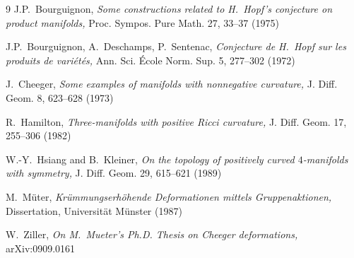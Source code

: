 \documentclass[11pt]{amsart}
\theoremstyle{definition}
\begin{document}
\begin{thebibliography}{9}
J.P.~Bourguignon, \textit{Some constructions related to H.~Hopf's conjecture on product manifolds,} Proc. Sympos. Pure Math. 27, 33--37 (1975)

J.P.~Bourguignon, A.~Deschamps, P.~Sentenac, \textit{Conjecture de H.~Hopf sur les produits de vari\'et\'es,} Ann. Sci. \'Ecole Norm. Sup. 5, 277--302 (1972)

J.~Cheeger, \textit{Some examples of manifolds with nonnegative curvature,} J. Diff. Geom. 8, 623--628 (1973)

R.~Hamilton, \textit{Three-manifolds with positive Ricci curvature,} J. Diff. Geom. 17, 255--306 (1982)

W.-Y.~Hsiang and B.~Kleiner, \textit{On the topology of positively curved $4$-manifolds with symmetry,} J. Diff. Geom. 29, 615--621 (1989)

M.~M\"uter, \textit{Kr\"ummungserh\"ohende Deformationen mittels Gruppenaktionen,} Dissertation, Universit\"at M\"unster (1987)

W.~Ziller, \textit{On M.~Mueter's Ph.D. Thesis on Cheeger deformations,} arXiv:0909.0161
\end{thebibliography}
\end{document}
